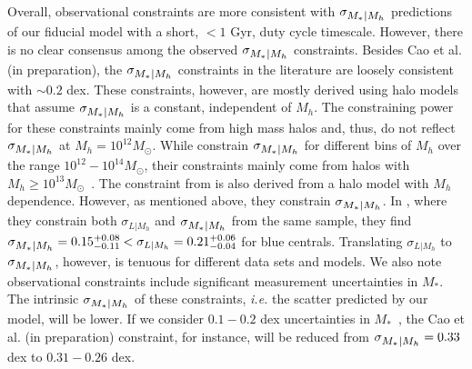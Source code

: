 \documentclass[12pt, letterpaper, preprint, tighten]{aastex62}
\newcommand{\cao}{Cao et al. (in preparation)}
\newcommand{\siglogm}{\sigma_{\scaleto{M_*|M_h}{8pt}}}
\begin{document}
Overall, observational constraints are more consistent with $\siglogm$ 
predictions of our fiducial model with a short, $< 1$ Gyr, duty cycle timescale. 
However, there is no clear consensus among the observed $\siglogm$ constraints. 
Besides \cao, the $\siglogm$ constraints in the literature are loosely 
consistent with $\sim 0.2$ dex. These constraints, however, are mostly derived 
using halo models that assume $\siglogm$ is a constant, independent of $M_h$. 
The constraining power for these constraints mainly come from high mass halos 
and, thus, do not reflect $\siglogm$ at $M_h=10^{12}M_\odot$.
While \cite{reddick2013} constrain $\siglogm$ for different bins of
$M_h$ over the range $10^{12} - 10^{14} M_\odot$, their constraints mainly come 
from halos with $M_h \ge 10^{13}M_\odot$~\citep{wechsler2018}. The constraint from
\cite{lange2018a} is also derived from a halo model with $M_h$ dependence. However, 
as mentioned above, they constrain $\siglogm$. In \cite{more2011}, where 
they constrain both $\sigma_{L|M_h}$ and $\siglogm$ from the same sample, 
they find $\siglogm = 0.15\substack{+0.08\\ -0.11} < \sigma_{L|M_h} = 0.21\substack{+0.06\\ -0.04}$
for blue centrals. Translating $\sigma_{L|M_h}$ to $\siglogm$, however, 
is tenuous for different data sets and models. We also note observational constraints 
include significant measurement uncertainties in $M_*$. The intrinsic $\siglogm$ of 
these constraints, \emph{i.e.} the scatter predicted by our model, will be lower. 
If we consider $0.1 - 0.2$ dex uncertainties in $M_*$~\citep{roediger2015}, the
Cao et al. (in preparation) constraint, for instance, will be reduced from
$\siglogm = 0.33$ dex to $0.31 - 0.26$ dex. 
\end{document}
